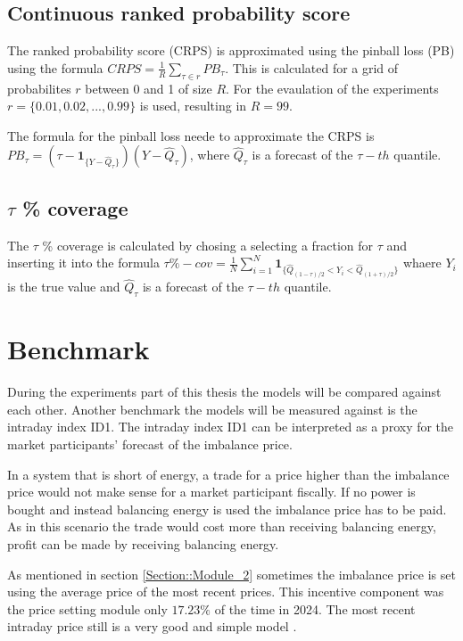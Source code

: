\documentclass[class=scrbook, crop=false]{standalone}
\begin{document}
\subsection{Continuous ranked probability score}

The ranked probability score (CRPS) is approximated using the pinball loss (PB) using the formula $CRPS = \frac{1}{R} \sum_{\tau\in r} PB_{\tau}$. 
This is calculated for a grid of probabilites $r$ between 0 and 1 of size $R$.
For the evaulation of the experiments $r=\{0.01, 0.02, ..., 0.99\}$ is used, resulting in $R=99$.

The formula for the pinball loss neede to approximate the CRPS is $PB_{\tau} = (\tau - \mathbf{1}_{\{Y - \hat{Q}_{\tau}\}}) (Y-\hat{Q}_{\tau}) $,
where $\hat{Q}_{\tau}$ is a forecast of the $\tau -th$ quantile.

\subsection{$\tau$ \% coverage}

The $\tau$ \% coverage is calculated by chosing a selecting a fraction for $\tau$ and inserting it into the formula $\tau\%-cov = \frac{1}{N} \sum_{i=1}^{N} \mathbf{1}_{\{\hat{Q}_{(1-\tau)/2} < Y_i < \hat{Q}_{(1+\tau)/2} \}}$
whaere $Y_i$ is the true value and $\hat{Q}_{\tau}$ is a forecast of the $\tau -th$ quantile.

\section{Benchmark}
\label{Section:Benchmark}

During the experiments part of this thesis the models will be compared against each other.
Another benchmark the models will be measured against is the intraday index ID1.
The intraday index ID1 can be interpreted as a proxy for the market participants' forecast of the imbalance price.

In a system that is short of energy, a trade for a price higher than the imbalance price would not make sense for a market participant fiscally.
If no power is bought and instead balancing energy is used the imbalance price has to be paid. 
As in this scenario the trade would cost more than receiving balancing energy, profit can be made by receiving balancing energy.

As mentioned in section \ref{Section::Module_2} sometimes the imbalance price is set using the average price of the most recent prices.
This incentive component was the price setting module only $17.23\%$ of the time in 2024.
The most recent intraday price still is a very good and simple model \cite{narajewskiProbabilisticForecastingGerman2022}.
\end{document}
